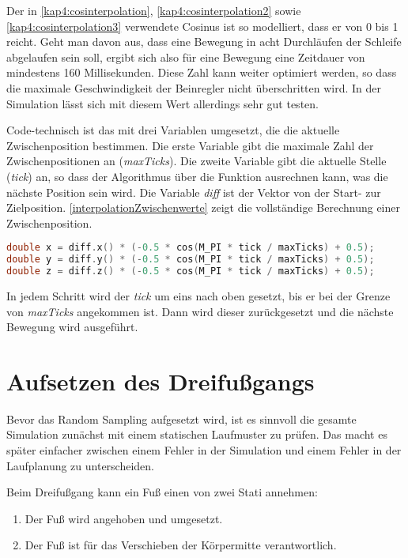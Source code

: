 \begin{itemize}
Der in \autoref{kap4:cosinterpolation}, \autoref{kap4:cosinterpolation2} sowie \autoref{kap4:cosinterpolation3} verwendete Cosinus ist so modelliert, dass er von 0 bis 1 reicht. Geht man davon aus, dass eine Bewegung in acht Durchläufen der Schleife abgelaufen sein soll, ergibt sich also für eine Bewegung eine Zeitdauer von mindestens 160 Millisekunden. Diese Zahl kann weiter optimiert werden, so dass die maximale Geschwindigkeit der Beinregler nicht überschritten wird. In der Simulation lässt sich mit diesem Wert allerdings sehr gut testen.

Code-technisch ist das mit drei Variablen umgesetzt, die die aktuelle Zwischenposition bestimmen. Die erste Variable gibt die maximale Zahl der Zwischenpositionen an (\emph{maxTicks}). Die zweite Variable gibt die aktuelle Stelle (\emph{tick}) an, so dass der Algorithmus über die Funktion ausrechnen kann, was die nächste Position sein wird. Die Variable \emph{diff} ist der Vektor von der Start- zur Zielposition. \autoref{interpolationZwischenwerte} zeigt die vollständige Berechnung einer Zwischenposition.

\begin{lstlisting}[label={interpolationZwischenwerte}, language=C++, caption={Interpolation der Zwischenpositionen}]
double x = diff.x() * (-0.5 * cos(M_PI * tick / maxTicks) + 0.5);
double y = diff.y() * (-0.5 * cos(M_PI * tick / maxTicks) + 0.5);
double z = diff.z() * (-0.5 * cos(M_PI * tick / maxTicks) + 0.5);
\end{lstlisting}

In jedem Schritt wird der \emph{tick} um eins nach oben gesetzt, bis er bei der Grenze von \emph{maxTicks} angekommen ist. Dann wird dieser zurückgesetzt und die nächste Bewegung wird ausgeführt.

\section{Aufsetzen des Dreifußgangs}

Bevor das Random Sampling aufgesetzt wird, ist es sinnvoll die gesamte Simulation zunächst mit einem statischen Laufmuster zu prüfen. Das macht es später einfacher zwischen einem Fehler in der Simulation und einem Fehler in der Laufplanung zu unterscheiden.

Beim Dreifußgang kann ein Fuß einen von zwei Stati annehmen:
\begin{enumerate}
  \item Der Fuß wird angehoben und umgesetzt.
  \item Der Fuß ist für das Verschieben der Körpermitte verantwortlich.
\end{enumerate}


\end{itemize}
